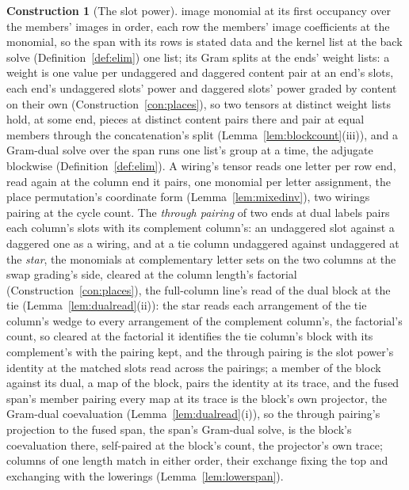 \documentclass[11pt]{article}
\theoremstyle{definition}
\newtheorem{construction}{Construction}
\begin{document}
\begin{construction}[The slot power]
image monomial at its first occupancy over the members' images in
order, each row the members' image coefficients at the monomial,
so the span with its rows is stated data and the kernel list at
the back solve (Definition~\ref{def:elim}) one list; its Gram
splits at the ends' weight lists: a weight is one value per undaggered and daggered
content pair at an end's slots, each end's undaggered slots' power
and daggered slots' power graded by content on their own
(Construction~\ref{con:places}), so two tensors at distinct weight
lists hold, at some end, pieces at distinct content pairs there and
pair at equal members through the concatenation's split
(Lemma~\ref{lem:blockcount}(iii)), and a Gram-dual solve over the
span runs one list's group at a time, the adjugate blockwise
(Definition~\ref{def:elim}). A wiring's tensor reads one letter
per row end, read again at the column end it pairs, one monomial per
letter assignment, the place permutation's coordinate form
(Lemma~\ref{lem:mixedinv}), two wirings pairing at the cycle count.
The \emph{through pairing} of two ends at dual labels pairs each
column's slots with its complement column's: an undaggered slot
against a daggered one as a wiring, and at a tie column undaggered
against undaggered at the
\emph{star}, the monomials at complementary letter sets on the two
columns at the swap grading's side, cleared at the column length's
factorial (Construction~\ref{con:places}), the full-column line's
read of the dual block at the tie (Lemma~\ref{lem:dualread}(ii)):
the star reads each arrangement of the tie column's wedge to every
arrangement of the complement column's, the factorial's count, so
cleared at the factorial it identifies the tie column's block with
its complement's with the pairing kept, and the through pairing is
the slot power's identity at the matched slots read across the
pairings; a member of the block against its dual, a map of the
block, pairs the identity at its trace, and the fused span's member
pairing every map at its trace is the block's own projector, the
Gram-dual coevaluation (Lemma~\ref{lem:dualread}(i)), so the
through pairing's projection to the fused span, the span's
Gram-dual solve, is the block's coevaluation there, self-paired at
the block's count, the projector's own trace; columns of one length
match in either order, their exchange fixing the top and exchanging
with the lowerings (Lemma~\ref{lem:lowerspan}).
\end{construction}
\end{document}
